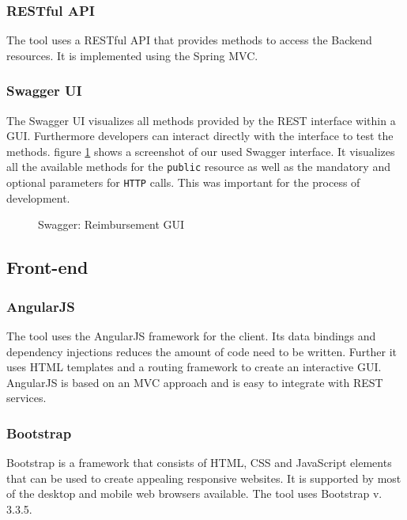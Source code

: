 \subsubsection{RESTful API}
\label{sec:restfulapi}
The tool uses a RESTful API that provides methods to access the Backend resources. It is implemented using the Spring MVC. 

\subsubsection{Swagger UI}
The Swagger UI visualizes all methods provided by the REST interface within a GUI. Furthermore developers can interact directly with the interface to test the methods. figure \ref{fig:swagger01} shows a screenshot of our used Swagger interface. It visualizes all the available methods for the \texttt{public} resource as well as the mandatory and optional parameters for \texttt{HTTP} calls. This was important for the process of development. \cite{swagger}

\begin{figure}[H]
    \centering
    \caption{Swagger: Reimbursement GUI}
    \label{fig:swagger01}
\end{figure}

\subsection{Front-end}

\subsubsection{AngularJS}
The tool uses the AngularJS framework for the client. Its data bindings and dependency injections reduces the amount of code need to be written. Further it uses HTML templates and a routing framework to create an interactive GUI. AngularJS is based on an MVC approach and is easy to integrate with REST services. \cite{angular}   

\subsubsection{Bootstrap}
Bootstrap is a framework that consists of HTML, CSS and JavaScript elements that can be used to create appealing responsive websites. It is supported by most of the desktop and mobile web browsers available. The tool uses Bootstrap v. 3.3.5. \cite{bootstrap}

